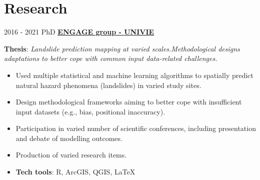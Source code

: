 \documentclass[letterpaper]{twentysecondcv} %
\begin{document}
\section{Research}
\begin{twenty}
	\twentyitem
    	{2016 - 2021}
		{}
        {PhD }
        {\href{https://geographie.univie.ac.at/arbeitsgruppen/engage-geomorphologische-systeme-und-risikoforschung/}{\normalsize  \textbf{\underline{ENGAGE group - UNIVIE}}}}
        {}
        {
       	\hspace{1mm}
       	
       	\textbf{Thesis}: \textit{Landslide prediction mapping at varied scales.Methodological designs adaptations to better cope with common input data-related challenges.}
        {\begin{itemize}
        \item Used multiple statistical and machine learning algorithms to spatially predict natural hazard phenomena (landslides) in varied study sites. 
        \item Design methodological frameworks aiming to better cope with insufficient input datasets (e.g., bias, positional inaccuracy). 
        \item Participation in varied number of scientific conferences, including presentation and debate of modelling outcomes.
        \item Production of varied research items.
        \item \textbf{Tech tools}: R, ArcGIS, QGIS, \large \LaTeX
		\end{itemize}}
        }
\end{twenty}
\end{document}
